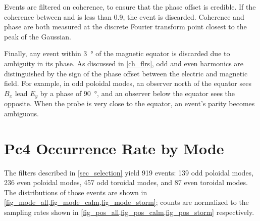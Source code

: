 

Events are filtered on coherence, to ensure that the phase offset is credible. If the coherence between  and  is less than 0.9, the event is discarded. Coherence and phase are both measured at the discrete Fourier transform point closest to the peak of the Gaussian. 

Finally, any event within \SI{3}{\degree} of the magnetic equator is discarded due to ambiguity in its phase. As discussed in \cref{ch_flrs}, odd and even harmonics are distinguished by the sign of the phase offset between the electric and magnetic field. For example, in odd poloidal modes, an observer north of the equator sees $B_x$ lead $E_y$ by a phase of \SI{90}{\degree}, and an observer below the equator sees the opposite. When the probe is very close to the equator, an event's parity becomes ambiguous. 

\section{Pc4 Occurrence Rate by Mode}

The filters described in \cref{sec_selection} yield 919 events: 139 odd poloidal modes, 236 even poloidal modes, 457 odd toroidal modes, and 87 even toroidal modes. The distributions of those events are shown in \cref{fig_mode_all,fig_mode_calm,fig_mode_storm}; counts are normalized to the sampling rates shown in \cref{fig_pos_all,fig_pos_calm,fig_pos_storm} respectively. 


